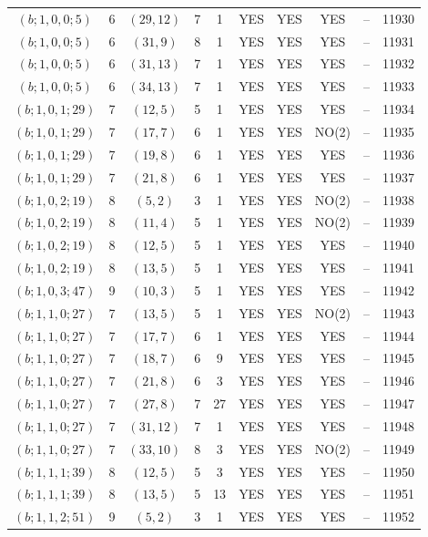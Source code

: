 \begin{longtable}{|c|c|c|c|c|c|c|c|c|c|}
$(b; 1, 0, 0; 5)$ & 6 & $(29, 12)$ & 7 & 1 & YES & YES & YES & -- & 11930\\
$(b; 1, 0, 0; 5)$ & 6 & $(31, 9)$ & 8 & 1 & YES & YES & YES & -- & 11931\\
$(b; 1, 0, 0; 5)$ & 6 & $(31, 13)$ & 7 & 1 & YES & YES & YES & -- & 11932\\
$(b; 1, 0, 0; 5)$ & 6 & $(34, 13)$ & 7 & 1 & YES & YES & YES & -- & 11933\\
$(b; 1, 0, 1; 29)$ & 7 & $(12, 5)$ & 5 & 1 & YES & YES & YES & -- & 11934\\
$(b; 1, 0, 1; 29)$ & 7 & $(17, 7)$ & 6 & 1 & YES & YES & NO(2) & -- & 11935\\
$(b; 1, 0, 1; 29)$ & 7 & $(19, 8)$ & 6 & 1 & YES & YES & YES & -- & 11936\\
$(b; 1, 0, 1; 29)$ & 7 & $(21, 8)$ & 6 & 1 & YES & YES & YES & -- & 11937\\
$(b; 1, 0, 2; 19)$ & 8 & $(5, 2)$ & 3 & 1 & YES & YES & NO(2) & -- & 11938\\
$(b; 1, 0, 2; 19)$ & 8 & $(11, 4)$ & 5 & 1 & YES & YES & NO(2) & -- & 11939\\
$(b; 1, 0, 2; 19)$ & 8 & $(12, 5)$ & 5 & 1 & YES & YES & YES & -- & 11940\\
$(b; 1, 0, 2; 19)$ & 8 & $(13, 5)$ & 5 & 1 & YES & YES & YES & -- & 11941\\
$(b; 1, 0, 3; 47)$ & 9 & $(10, 3)$ & 5 & 1 & YES & YES & YES & -- & 11942\\
$(b; 1, 1, 0; 27)$ & 7 & $(13, 5)$ & 5 & 1 & YES & YES & NO(2) & -- & 11943\\
$(b; 1, 1, 0; 27)$ & 7 & $(17, 7)$ & 6 & 1 & YES & YES & YES & -- & 11944\\
$(b; 1, 1, 0; 27)$ & 7 & $(18, 7)$ & 6 & 9 & YES & YES & YES & -- & 11945\\
$(b; 1, 1, 0; 27)$ & 7 & $(21, 8)$ & 6 & 3 & YES & YES & YES & -- & 11946\\
$(b; 1, 1, 0; 27)$ & 7 & $(27, 8)$ & 7 & 27 & YES & YES & YES & -- & 11947\\
$(b; 1, 1, 0; 27)$ & 7 & $(31, 12)$ & 7 & 1 & YES & YES & YES & -- & 11948\\
$(b; 1, 1, 0; 27)$ & 7 & $(33, 10)$ & 8 & 3 & YES & YES & NO(2) & -- & 11949\\
$(b; 1, 1, 1; 39)$ & 8 & $(12, 5)$ & 5 & 3 & YES & YES & YES & -- & 11950\\
$(b; 1, 1, 1; 39)$ & 8 & $(13, 5)$ & 5 & 13 & YES & YES & YES & -- & 11951\\
$(b; 1, 1, 2; 51)$ & 9 & $(5, 2)$ & 3 & 1 & YES & YES & YES & -- & 11952\\

\end{longtable}
